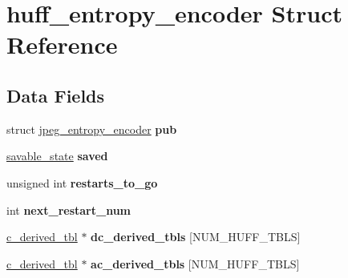\hypertarget{structhuff__entropy__encoder}{}\section{huff\+\_\+entropy\+\_\+encoder Struct Reference}
\label{structhuff__entropy__encoder}
\subsection*{Data Fields}
\begin{DoxyCompactItemize}
\item 
\mbox{\label{structhuff__entropy__encoder_a1f8fba730cff996676719295f1d77c6f}} 
struct \hyperlink{structjpeg__entropy__encoder}{jpeg\+\_\+entropy\+\_\+encoder} {\bfseries pub}
\item 
\mbox{\label{structhuff__entropy__encoder_a3e23b9b8db37a99cddd58f23cf54ebb0}} 
\hyperlink{structsavable__state}{savable\+\_\+state} {\bfseries saved}
\item 
\mbox{\label{structhuff__entropy__encoder_a50bb63b0114a26bccea7f609f1eb0d28}} 
unsigned int {\bfseries restarts\+\_\+to\+\_\+go}
\item 
\mbox{\label{structhuff__entropy__encoder_a3ff97c7e358a731ef927ec117437d21b}} 
int {\bfseries next\+\_\+restart\+\_\+num}
\item 
\mbox{\label{structhuff__entropy__encoder_a29d4cebe60e13ce8eb45413a2ea6327f}} 
\hyperlink{structc__derived__tbl}{c\+\_\+derived\+\_\+tbl} $\ast$ {\bfseries dc\+\_\+derived\+\_\+tbls} \mbox{[}N\+U\+M\+\_\+\+H\+U\+F\+F\+\_\+\+T\+B\+LS\mbox{]}
\item 
\mbox{\label{structhuff__entropy__encoder_a98dc2c774757788bf83b1ce621d25295}} 
\hyperlink{structc__derived__tbl}{c\+\_\+derived\+\_\+tbl} $\ast$ {\bfseries ac\+\_\+derived\+\_\+tbls} \mbox{[}N\+U\+M\+\_\+\+H\+U\+F\+F\+\_\+\+T\+B\+LS\mbox{]}
\item 
\mbox{\label{structhuff__entropy__encoder_afdd4c60480a66611f5e3d5ed33d154d3}} 

\end{DoxyCompactItemize}

